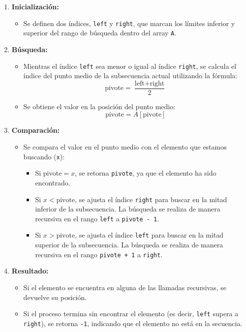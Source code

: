 \documentclass[twoside,spanish]{elsarticle}
\begin{document}
\begin{enumerate}
    \item \textbf{Inicialización:}
    \begin{itemize}
        \item Se definen dos índices, \texttt{left} y \texttt{right}, que marcan los límites inferior y superior del rango de búsqueda dentro del array \texttt{A}.
    \end{itemize}
    
    \item \textbf{Búsqueda:}
    \begin{itemize}
        \item Mientras el índice \texttt{left} sea menor o igual al índice \texttt{right}, se calcula el índice del punto medio de la subsecuencia actual utilizando la fórmula:
        \[
        \text{pivote} = \frac{\text{left} + \text{right}}{2}
        \]
        \item Se obtiene el valor en la posición del punto medio:
        \[
        \text{pivote} = A[\text{pivote}]
        \]
    \end{itemize}
    
    \item \textbf{Comparación:}
    \begin{itemize}
        \item Se compara el valor en el punto medio con el elemento que estamos buscando (\texttt{x}):
        \begin{itemize}
            \item Si \(\text{pivote} = x\), se retorna \texttt{pivote}, ya que el elemento ha sido encontrado.
            \item Si \(x < \text{pivote}\), se ajusta el índice \texttt{right} para buscar en la mitad inferior de la subsecuencia. La búsqueda se realiza de manera recursiva en el rango \texttt{left} a \texttt{pivote - 1}.
            \item Si \(x > \text{pivote}\), se ajusta el índice \texttt{left} para buscar en la mitad superior de la subsecuencia. La búsqueda se realiza de manera recursiva en el rango \texttt{pivote + 1} a \texttt{right}.
        \end{itemize}
    \end{itemize}
    
    \item \textbf{Resultado:}
    \begin{itemize}
        \item Si el elemento se encuentra en alguna de las llamadas recursivas, se devuelve su posición.
        \item Si el proceso termina sin encontrar el elemento (es decir, \texttt{left} supera a \texttt{right}), se retorna \texttt{-1}, indicando que el elemento no está en la secuencia.
    \end{itemize}
\end{enumerate}
\end{document}
